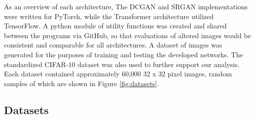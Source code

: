 \documentclass[letterpaper]{article} %
\begin{document}
As an overview of each architecture,
The DCGAN and SRGAN implementations were written for PyTorch,
while the Transformer architecture utilized TensorFlow.
A python module of utility functions was created and shared between the programs via GitHub,
so that evaluations of altered images would be consistent and comparable for all architectures.
A dataset of images was generated
for the purposes of training and testing the developed networks.
The standardized CIFAR-10 dataset
was also used to further support our analysis.
Each dataset contained approximately 60,000 32 x 32 pixel images,
random samples of which are shown in Figure \ref{fig:datasets}.

\subsection{Datasets}
\end{document}
